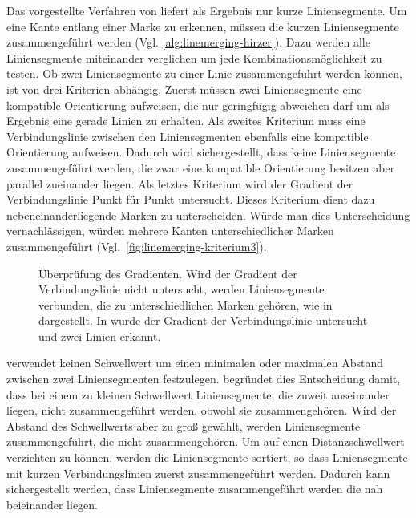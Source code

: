 Das vorgestellte Verfahren von \citeauthor{clarke96} liefert als Ergebnis nur kurze Liniensegmente. Um eine Kante
 entlang einer Marke zu erkennen, müssen die kurzen Liniensegmente zusammengeführt werden
 (Vgl. \autoref{alg:linemerging-hirzer}). Dazu werden alle Liniensegmente miteinander verglichen um jede
 Kombinationsmöglichkeit zu testen. Ob zwei Liniensegmente zu einer Linie zusammengeführt werden können, ist von drei
 Kriterien abhängig. Zuerst müssen zwei Liniensegmente eine kompatible Orientierung aufweisen, die nur geringfügig
 abweichen darf um als Ergebnis eine gerade Linien zu erhalten. Als zweites Kriterium muss eine Verbindungslinie
 zwischen den Liniensegmenten ebenfalls eine kompatible Orientierung aufweisen. Dadurch wird sichergestellt, dass keine
 Liniensegmente zusammengeführt werden, die zwar eine kompatible Orientierung besitzen aber parallel zueinander liegen.
 Als letztes Kriterium wird der Gradient der Verbindungslinie Punkt für Punkt untersucht. Dieses Kriterium dient dazu
 nebeneinanderliegende Marken zu unterscheiden. Würde man dies Unterscheidung vernachlässigen, würden mehrere Kanten
 unterschiedlicher Marken zusammengeführt (Vgl.~\autoref{fig:linemerging-kriterium3}).

\begin{figure}[!ht]
	\centering
	\caption{Überprüfung des Gradienten. Wird der Gradient der Verbindungslinie nicht untersucht, werden Liniensegmente
	 verbunden, die zu unterschiedlichen Marken gehören, wie in  dargestellt. In
	  wurde der Gradient der Verbindungslinie untersucht und zwei Linien erkannt.}
	\label{fig:linemerging-kriterium3}
\end{figure}

\citeauthor{hirzer08} verwendet keinen Schwellwert um einen minimalen oder maximalen Abstand zwischen zwei
 Liniensegmenten festzulegen. \citeauthor{hirzer08} begründet dies Entscheidung damit, dass bei einem zu kleinen
 Schwellwert Liniensegmente, die zuweit auseinander liegen, nicht zusammengeführt werden, obwohl sie zusammengehören.
 Wird der Abstand des Schwellwerts aber zu groß gewählt, werden Liniensegmente zusammengeführt, die nicht
 zusammengehören. Um auf einen Distanzschwellwert verzichten zu können, werden die Liniensegmente sortiert, so dass
 Liniensegmente mit kurzen Verbindungslinien zuerst zusammengeführt werden. Dadurch kann sichergestellt werden, dass
 Liniensegmente zusammengeführt werden die nah beieinander liegen.

